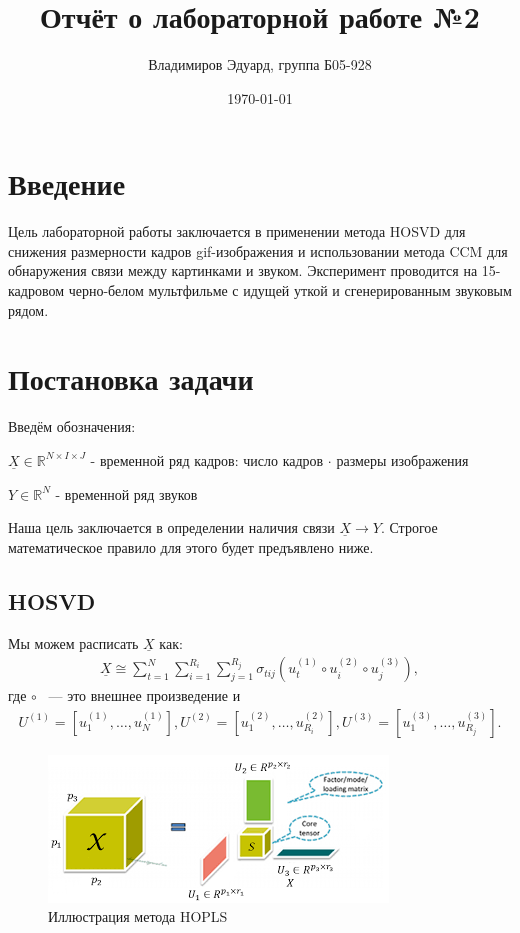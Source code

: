 \documentclass[a4paper,14pt]{article}
\author{Владимиров Эдуард, группа Б05-928}
\title{\textbf{Отчёт о лабораторной работе №2}}
\date{\today}
\newcommand{\uX}{\ensuremath{\underline{X}}}
\theoremstyle{plain} %
\theoremstyle{definition} %
\theoremstyle{remark} %
\begin{document}
	\maketitle

	\section{Введение}
	Цель лабораторной работы заключается в применении метода HOSVD для снижения размерности кадров gif-изображения и использовании метода CCM для обнаружения связи между картинками и звуком.  
	Эксперимент проводится на 15-кадровом черно-белом мультфильме с идущей уткой и сгенерированным звуковым рядом.
	
	\section{Постановка задачи}
	Введём обозначения:  
	
	$\uX \in \mathds{R}^{N \times I \times J}$ - временной ряд кадров: число кадров $\cdot$ размеры изображения
	
	$Y \in \mathds{R}^N$ - временной ряд звуков
	
	Наша цель заключается в определении наличия связи $\uX \rightarrow Y$. Строгое математическое правило для этого будет предъявлено ниже.
	
	\subsection{HOSVD}
	Мы можем расписать $\uX$ как: 
	\begin{gather*}
		\uX \cong \sum_{t=1}^{N} \sum_{i=1}^{R_i} \sum_{j=1}^{R_j} \sigma_{t i j} (u^{(1)}_t \circ u^{(2)}_i \circ u^{(3)}_j),
	\end{gather*}
	где $\circ$ ~--- это внешнее произведение и 
	\begin{gather*}
		U^{(1)} = \left[ u^{(1)}_{1}, \dots , u^{(1)}_{N} \right],
		U^{(2)} = \left[ u^{(2)}_{1}, \dots , u^{(2)}_{R_i} \right], 
		U^{(3)} = \left[ u^{(3)}_{1}, \dots , u^{(3)}_{R_j} \right].
	\end{gather*}
	
	\begin{figure}[bhtp]
		\centering
		\includegraphics[width=\linewidth]{hosvd-2.png}
		\caption{Иллюстрация метода HOPLS}
	\end{figure}
	
\end{document}
